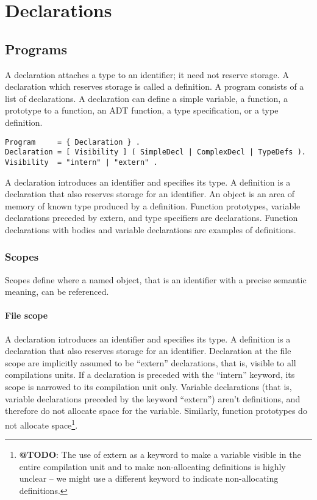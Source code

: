 
\hypertarget{declarations}{%
\chapter{Declarations}\label{declarations}}

\hypertarget{programs}{%
\section{Programs}\label{programs}}

A declaration attaches a type to an identifier; it need not reserve
storage. A declaration which reserves storage is called a definition. A
program consists of a list of declarations. A declaration can define a
simple variable, a function, a prototype to a function, an ADT function,
a type specification, or a type definition.

\begin{lstlisting}
Program     = { Declaration } .
Declaration = [ Visibility ] ( SimpleDecl | ComplexDecl | TypeDefs ).
Visibility  = "intern" | "extern" .
\end{lstlisting}

A declaration introduces an identifier and specifies its type. A
definition is a declaration that also reserves storage for an
identifier. An object is an area of memory of known type produced by a
definition. Function prototypes, variable declarations preceded by
extern, and type specifiers are declarations. Function declarations with
bodies and variable declarations are examples of definitions.

\hypertarget{scopes}{%
\subsection{Scopes}\label{scopes}}

Scopes define where a named object, that is an identifier with a precise
semantic meaning, can be referenced.

\hypertarget{file-scope}{%
\subsubsection{File scope}\label{file-scope}}

A declaration introduces an identifier and specifies its type. A
definition is a declaration that also reserves storage for an
identifier. Declaration at the file scope are implicitly assumed to be
``extern'' declarations, that is, visible to all compilations units. If
a declaration is preceded with the ``intern'' keyword, its scope is
narrowed to its compilation unit only. Variable declarations (that is,
variable declarations preceded by the keyword ``extern'') aren't
definitions, and therefore do not allocate space for the variable.
Similarly, function prototypes do not allocate space\footnote{\textbf{@TODO}:
  The use of extern as a keyword to make a variable visible in the
  entire compilation unit and to make non-allocating definitions is
  highly unclear -- we might use a different keyword to indicate
  non-allocating definitions.}.

